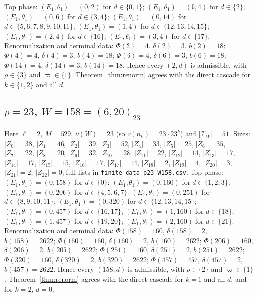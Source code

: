 Top phase: $(E_1,\theta_1)=(0,2)$ for $d\in\{0,1\}$; $(E_1,\theta_1)=(0,4)$ for $d\in\{2\}$; $(E_1,\theta_1)=(0,6)$ for $d\in\{3,4\}$; $(E_1,\theta_1)=(0,14)$ for $d\in\{5,6,7,8,9,10,11\}$; $(E_1,\theta_1)=(1,4)$ for $d\in\{12,13,14,15\}$; $(E_1,\theta_1)=(2,4)$ for $d\in\{16\}$; $(E_1,\theta_1)=(3,4)$ for $d\in\{17\}$.
Renormalization and terminal data: $\Phi(2)=4$, $\delta(2)=3$, $b(2)=18$; $\Phi(4)=4$, $\delta(4)=3$, $b(4)=18$; $\Phi(6)=4$, $\delta(6)=3$, $b(6)=18$; $\Phi(14)=4$, $\delta(14)=3$, $b(14)=18$. Hence every $(2,d)$ is admissible, with $\rho\in\{3\}$ and $\varpi\in\{1\}$. Theorem~\ref{thm:renorm} agrees with the direct cascade for $k\in\{1,2\}$ and all $d$.

\subsection*{$p=23$, $W=158=(6,20)_{23}$}
Here $\ell=2$, $M=529$, $\nu(W)=23$ (so $\nu(n_k)=23\cdot23^k$) and $|\mathcal T_W|=51$.
Sizes: $|Z_{0}|=38$, $|Z_{1}|=46$, $|Z_{2}|=39$, $|Z_{3}|=52$, $|Z_{4}|=33$, $|Z_{5}|=25$, $|Z_{6}|=35$, $|Z_{7}|=22$, $|Z_{8}|=20$, $|Z_{9}|=32$, $|Z_{10}|=28$, $|Z_{11}|=22$, $|Z_{12}|=14$, $|Z_{13}|=17$, $|Z_{14}|=17$, $|Z_{15}|=15$, $|Z_{16}|=17$, $|Z_{17}|=14$, $|Z_{18}|=2$, $|Z_{19}|=4$, $|Z_{20}|=3$, $|Z_{21}|=2$, $|Z_{22}|=0$; full lists in \texttt{finite\_data\_p23\_W158.csv}.
Top phase: $(E_1,\theta_1)=(0,158)$ for $d\in\{0\}$; $(E_1,\theta_1)=(0,160)$ for $d\in\{1,2,3\}$; $(E_1,\theta_1)=(0,206)$ for $d\in\{4,5,6,7\}$; $(E_1,\theta_1)=(0,251)$ for $d\in\{8,9,10,11\}$; $(E_1,\theta_1)=(0,320)$ for $d\in\{12,13,14,15\}$; $(E_1,\theta_1)=(0,457)$ for $d\in\{16,17\}$; $(E_1,\theta_1)=(1,160)$ for $d\in\{18\}$; $(E_1,\theta_1)=(1,457)$ for $d\in\{19,20\}$; $(E_1,\theta_1)=(2,160)$ for $d\in\{21\}$.
Renormalization and terminal data: $\Phi(158)=160$, $\delta(158)=2$, $b(158)=2622$; $\Phi(160)=160$, $\delta(160)=2$, $b(160)=2622$; $\Phi(206)=160$, $\delta(206)=2$, $b(206)=2622$; $\Phi(251)=160$, $\delta(251)=2$, $b(251)=2622$; $\Phi(320)=160$, $\delta(320)=2$, $b(320)=2622$; $\Phi(457)=457$, $\delta(457)=2$, $b(457)=2622$. Hence every $(158,d)$ is admissible, with $\rho\in\{2\}$ and $\varpi\in\{1\}$. Theorem~\ref{thm:renorm} agrees with the direct cascade for $k=1$ and all $d$, and for $k=2$, $d=0$.

